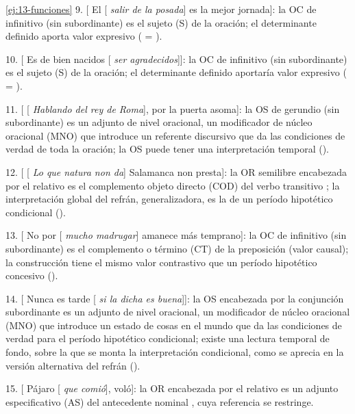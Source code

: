 \begin{solucion}{\ref{ej:13-funciones}}
9. [ El [ \textit{salir de la posada}] es la mejor
jornada]: la OC de infinitivo (sin subordinante) es el sujeto (S) de la
oración; el determinante definido aporta valor expresivo ( = ).

10. [ Es de bien nacidos [ \textit{ser agradecidos}]]: la
OC de infinitivo (sin subordinante) es el sujeto (S) de la oración; el
determinante definido aportaría valor expresivo ( = ).

11. [ [ \textit{Hablando del rey de Roma}], por la puerta
asoma]: la OS de gerundio (sin subordinante) es un adjunto de nivel oracional, un
modificador de núcleo oracional (MNO) que introduce un referente discursivo que
da las condiciones de verdad de toda la oración; la OS puede tener una
interpretación temporal ().

12. [ [ \textit{Lo que natura non da}] Salamanca non
presta]: la OR semilibre encabezada por el relativo  es el
complemento objeto directo (COD) del verbo transitivo ; la
interpretación global del refrán, generalizadora, es la de un período hipotético
condicional ().

13. [ No por [ \textit{mucho madrugar}] amanece más
temprano]: la OC de infinitivo (sin subordinante) es el complemento o término
(CT) de la preposición  (valor causal); la construcción tiene el
mismo valor contrastivo que un período hipotético concesivo ().

14. [ Nunca es tarde [ \textit{si la dicha es buena}]]:
la OS encabezada por la conjunción subordinante  es un adjunto de nivel
oracional, un modificador de núcleo oracional (MNO) que introduce un estado de
cosas en el mundo que da las condiciones de verdad para el período hipotético
condicional; existe una lectura temporal de fondo, sobre la que se monta la
interpretación condicional, como se aprecia en la versión alternativa del refrán
().

15. [ Pájaro [ \textit{que comió}], voló]: la OR
encabezada por el relativo  es un adjunto especificativo (AS) del
antecedente nominal , cuya referencia se restringe.


\end{solucion}
